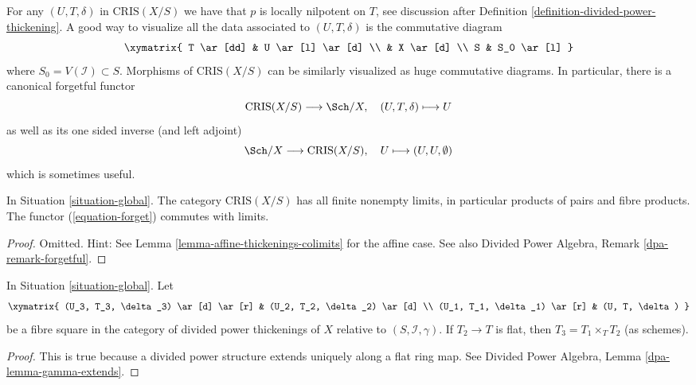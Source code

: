 \noindent
For any $(U, T, \delta)$ in $\text{CRIS}(X/S)$
we have that $p$ is locally nilpotent on $T$, see discussion after
Definition \ref{definition-divided-power-thickening}.
A good way to visualize all the data associated to $(U, T, \delta)$
is the commutative diagram
$$
\xymatrix{
T \ar[dd] & U \ar[l] \ar[d] \\
& X \ar[d] \\
S & S_0 \ar[l]
}
$$
where $S_0 = V(\mathcal{I}) \subset S$. Morphisms of $\text{CRIS}(X/S)$
can be similarly visualized as huge commutative diagrams. In particular,
there is a canonical forgetful functor
\begin{equation}
\label{equation-forget}
\text{CRIS}(X/S) \longrightarrow \Sch/X,\quad
(U, T, \delta) \longmapsto U
\end{equation}
as well as its one sided inverse (and left adjoint)
\begin{equation}
\label{equation-endow-trivial}
\Sch/X \longrightarrow \text{CRIS}(X/S),\quad
U \longmapsto (U, U, \emptyset)
\end{equation}
which is sometimes useful.

\begin{lemma}
\label{lemma-divided-power-thickening-fibre-products}
In Situation \ref{situation-global}.
The category $\text{CRIS}(X/S)$ has all finite nonempty limits,
in particular products of pairs and fibre products.
The functor (\ref{equation-forget}) commutes with limits.
\end{lemma}

\begin{proof}
Omitted. Hint: See Lemma \ref{lemma-affine-thickenings-colimits}
for the affine case. See also
Divided Power Algebra, Remark \ref{dpa-remark-forgetful}.
\end{proof}

\begin{lemma}
\label{lemma-divided-power-thickening-base-change-flat}
In Situation \ref{situation-global}. Let
$$
\xymatrix{
(U_3, T_3, \delta_3) \ar[d] \ar[r] & (U_2, T_2, \delta_2) \ar[d] \\
(U_1, T_1, \delta_1) \ar[r] & (U, T, \delta)
}
$$
be a fibre square in the category of divided power thickenings of
$X$ relative to $(S, \mathcal{I}, \gamma)$. If $T_2 \to T$ is
flat, then $T_3 = T_1 \times_T T_2$ (as schemes).
\end{lemma}

\begin{proof}
This is true because a divided power structure extends uniquely
along a flat ring map. See
Divided Power Algebra, Lemma \ref{dpa-lemma-gamma-extends}.
\end{proof}

